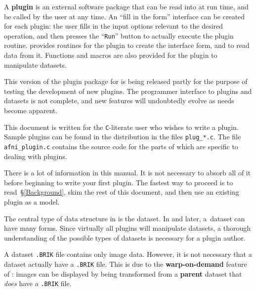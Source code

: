 \vspace{5ex}
\centerline{}
\vspace{6ex}

\noindent
A {\bf plugin} is an external software package that can be
read into \afnit at run time, and be called by the user at any time.
An ``fill in the form'' interface can be created for each plugin:
the user fills in the input options relevant to the desired operation,
and then presses the ``{\tt Run}'' button to actually execute the plugin routine.
\afnit provides routines for the plugin to create the interface form,
and to read data from it.  Functions and macros are also provided for
the plugin to manipulate \afnit datasets.

This version of the plugin package for \afnit is being released
partly for the purpose of testing the development of new plugins.
The programmer interface to plugins and \afnit datasets is not
complete, and new features will undoubtedly evolve as needs become
apparent.

This document
is written for the {\tt C}-literate \afnit user who wishes
to write a plugin.  Sample plugins can be found in the 
distribution in the files {\tt plug\_*.c}.  The file {\tt afni\_plugin.c}
contains the source code for the parts of \afnit which are specific
to dealing with plugins.

There is a lot of information in this manual.  It is not necessary to absorb
all of it before beginning to write your first plugin.  The fastest
way to proceed is to read~\S\ref{Background}, skim the rest of this document,
and then use an existing plugin as a model.


\newpage
{\footnotesize
 \tableofcontents
}
\newpage
\label{Background}
The central type of data structure in \afnit is the dataset.
In  and later, a~dataset can have many forms.
Since virtually all plugins will manipulate datasets, a
thorough understanding
of the possible types of datasets is necessary for a plugin author.

    A dataset {\tt .BRIK} file contains only image data.  However, it is
    not necessary that a dataset actually have a {\tt .BRIK} file.
    This is due to the {\bf warp-on-demand} feature of \afnit:
    images can be displayed by being transformed from a {\bf parent}
    dataset that {\it does\/} have a {\tt .BRIK} file.

